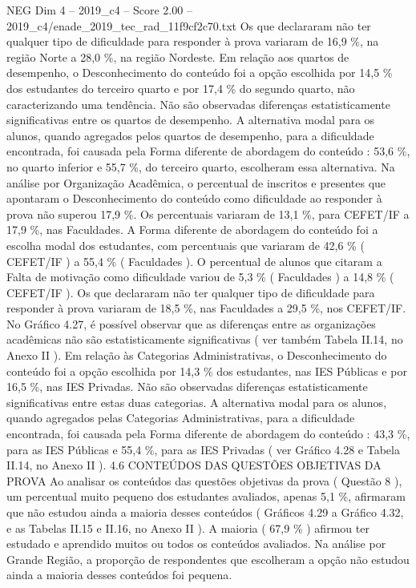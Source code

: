 \begin{textsample}{NEG Dim 4 – 2019\_c4 – Score 2.00 – 2019\_c4/enade\_2019\_tec\_rad\_11f9cf2c70.txt}
Os que declararam não ter qualquer tipo de dificuldade para responder à prova variaram de 16,9 \%, na região Norte a 28,0 \%, na região Nordeste.
Em relação aos quartos de desempenho, o Desconhecimento do conteúdo foi a opção escolhida por 14,5 \% dos estudantes do terceiro quarto e por 17,4 \% do segundo quarto, não caracterizando uma tendência.
Não são observadas diferenças estatisticamente significativas entre os quartos de desempenho.
A alternativa modal para os alunos, quando agregados pelos quartos de desempenho, para a dificuldade encontrada, foi causada pela Forma diferente de abordagem do conteúdo : 53,6 \%, no quarto inferior e 55,7 \%, do terceiro quarto, escolheram essa alternativa.
Na análise por Organização Acadêmica, o percentual de inscritos e presentes que apontaram o Desconhecimento do conteúdo como dificuldade ao responder à prova não superou 17,9 \%.
Os percentuais variaram de 13,1 \%, para CEFET/IF a 17,9 \%, nas Faculdades.
A Forma diferente de abordagem do conteúdo foi a escolha modal dos estudantes, com percentuais que variaram de 42,6 \% ( CEFET/IF ) a 55,4 \% ( Faculdades ).
O percentual de alunos que citaram a Falta de motivação como dificuldade variou de 5,3 \% ( Faculdades ) a 14,8 \% ( CEFET/IF ).
Os que declararam não ter qualquer tipo de dificuldade para responder à prova variaram de 18,5 \%, nas Faculdades a 29,5 \%, nos CEFET/IF.
No Gráfico 4.27, é possível observar que as diferenças entre as organizações acadêmicas não são estatisticamente significativas ( ver também Tabela II.14, no Anexo II ).
Em relação às Categorias Administrativas, o Desconhecimento do conteúdo foi a opção escolhida por 14,3 \% dos estudantes, nas IES Públicas e por 16,5 \%, nas IES Privadas.
Não são observadas diferenças estatisticamente significativas entre estas duas categorias.
A alternativa modal para os alunos, quando agregados pelas Categorias Administrativas, para a dificuldade encontrada, foi causada pela Forma diferente de abordagem do conteúdo : 43,3 \%, para as IES Públicas e 55,4 \%, para as IES Privadas ( ver Gráfico 4.28 e Tabela II.14, no Anexo II ). 4.6 CONTEÚDOS DAS QUESTÕES OBJETIVAS DA PROVA Ao analisar os conteúdos das questões objetivas da prova ( Questão 8 ), um percentual muito pequeno dos estudantes avaliados, apenas 5,1 \%, afirmaram que não estudou ainda a maioria desses conteúdos ( Gráficos 4.29 a Gráfico 4.32, e as Tabelas II.15 e II.16, no Anexo II ).
A maioria ( 67,9 \% ) afirmou ter estudado e aprendido muitos ou todos os conteúdos avaliados.
Na análise por Grande Região, a proporção de respondentes que escolheram a opção não estudou ainda a maioria desses conteúdos foi pequena.

\end{textsample}
